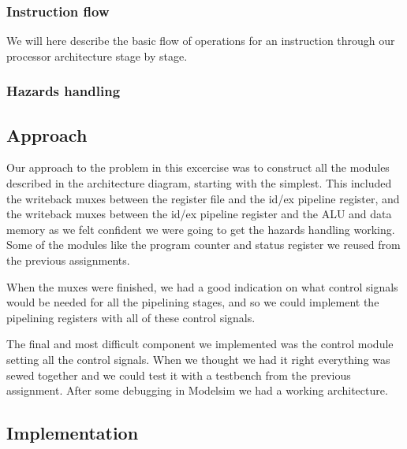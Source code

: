 \documentclass[11pt]{report}
\begin{document}
\subsubsection*{Instruction flow}
We will here describe the basic flow of operations for an instruction
through our processor architecture stage by stage.


\subsubsection{Hazards handling}

\subsection*{Approach}


Our approach to the problem in this excercise was to construct all the 
modules described in the architecture diagram, starting with the simplest.  %
This included the writeback muxes between the register file and the id/ex
pipeline register, and the writeback muxes between the id/ex pipeline 
register and the ALU and data memory as we felt confident we were going 
to get the hazards handling working. 
Some of the modules like the program counter and status register 
we reused from the previous assignments.

When the muxes were finished, we had a good indication on what control
signals would be needed for all the pipelining stages, and so we could 
implement the pipelining registers with all of these control signals.

The final and most difficult component we implemented was the control
module setting all the control signals. When we thought we had it right
everything was sewed together and we could test it with a testbench
from the previous assignment. After some debugging in Modelsim we had 
a working architecture.

\subsection*{Implementation}
\end{document}
